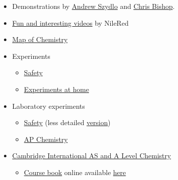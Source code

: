 \documentclass{article}
\begin{document}
\begin{itemize}
    \item Demonstrations by \href{https://www.youtube.com/playlist?list=PLbnrZHfNEDZxPZ369tAF0wjnNo-A3EcDi}{Andrew Szydlo} and \href{https://www.youtube.com/watch?v=ti_E2ZKZpC4}{Chris Bishop}.
    \item \href{https://www.youtube.com/channel/UCFhXFikryT4aFcLkLw2LBLA}{Fun and interesting videos} by NileRed 
    
    \item \href{https://www.youtube.com/watch?v=P3RXtoYCW4M}{Map of Chemistry}
    
    
    \item Experiments
    \begin{itemize}
        \item \href{https://melscience.com/US-en/articles/safety-guide-conducting-chemical-reactions-home/}{Safety}
        \item \href{https://melscience.com/US-en/experiments/}{Experiments at home}
    \end{itemize}
    
    \item Laboratory experiments
    \begin{itemize}
        \item \href{https://www.youtube.com/watch?v=9o77QEeM-68}{Safety} (less detailed \href{https://www.youtube.com/watch?v=VRWRmIEHr3A}{version})
        \item \href{https://www.youtube.com/watch?v=6F6D3XuZDVo&list=PLC10F4535D849964F}{AP Chemistry}
    \end{itemize}
    
    \item \href{https://www.cambridgeinternational.org/programmes-and-qualifications/cambridge-international-as-and-a-level-chemistry-9701/}{Cambridge International AS and A Level Chemistry}
    \begin{itemize}
        \item \href{https://www.cambridge.org/gb/education/subject/science/chemistry/cambridge-international-a-level-chemistry-2nd-edition/cambridge-international-as-and-a-level-chemistry-2nd-edition-coursebook-cd-rom?isbn=9781107638457&format=WW}{Course book} online available \href{https://web.archive.org/web/20210411103136/https://www.gceguide.xyz/gce-e-books/cambridge-international-as-and-a-level-chemistry-coursebook-2nd-edition}{here}
    \end{itemize}
    

\end{itemize}
\end{document}

